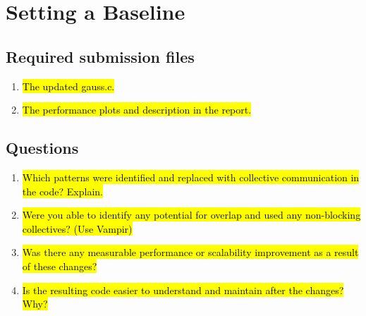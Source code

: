 \section{Setting a Baseline}
\subsection{Required submission files}
\begin{enumerate}
	\item \hl{The updated gauss.c.}

	\item \hl{The performance plots and description in the report.}

\end{enumerate}

\subsection{Questions}
\begin{enumerate}
	\item \hl{Which patterns were identified and replaced with collective communication in the code? Explain.}

	\item \hl{Were you able to identify any potential for overlap and used any non-blocking collectives? (Use Vampir)}	
	
	\item \hl{Was there any measurable performance or scalability improvement as a result of these changes?}		
	
	\item \hl{Is the resulting code easier to understand and maintain after the changes? Why?}	
\end{enumerate}




